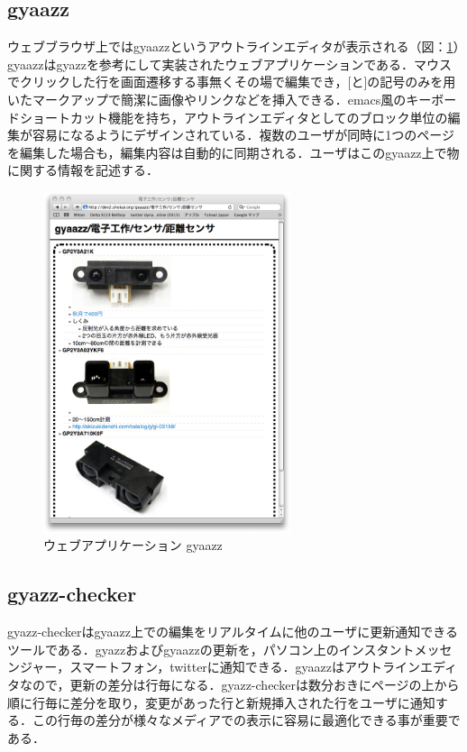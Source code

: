 \subsection{gyaazz}

ウェブブラウザ上ではgyaazzというアウトラインエディタが表示される（図：\ref{fig:gyaazz}）gyaazzはgyazz\cite{gyazz}を参考にして実装されたウェブアプリケーションである．マウスでクリックした行を画面遷移する事無くその場で編集でき，[と]の記号のみを用いたマークアップで簡潔に画像やリンクなどを挿入できる．emacs風のキーボードショートカット機能を持ち，アウトラインエディタとしてのブロック単位の編集が容易になるようにデザインされている．複数のユーザが同時に1つのページを編集した場合も，編集内容は自動的に同期される．ユーザはこのgyaazz上で物に関する情報を記述する．

\begin{figure}
  \begin{center}
    \includegraphics[height=100mm]{img/gyaazz.png}
  \end{center}
  \caption{ウェブアプリケーション gyaazz}
  \label{fig:gyaazz}
\end{figure}

\subsection{gyazz-checker}

gyazz-checkerはgyaazz上での編集をリアルタイムに他のユーザに更新通知できるツールである．gyazzおよびgyaazzの更新を，パソコン上のインスタントメッセンジャー，スマートフォン，twitterに通知できる．gyaazzはアウトラインエディタなので，更新の差分は行毎になる．gyazz-checkerは数分おきにページの上から順に行毎に差分を取り，変更があった行と新規挿入された行をユーザに通知する．この行毎の差分が様々なメディアでの表示に容易に最適化できる事が重要である．

